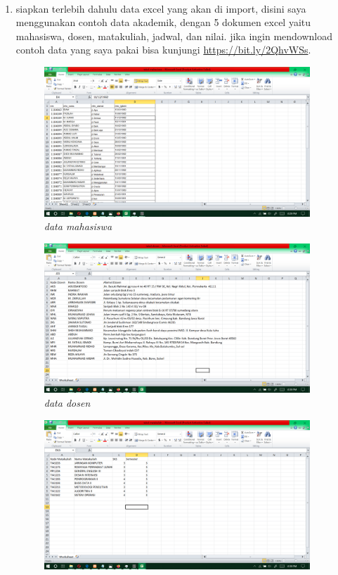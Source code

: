 \documentclass[12pt]{ociamthesis}  %
\begin{document}
\paragraph{}
\begin{enumerate}
	\item siapkan terlebih dahulu data excel yang akan di import, disini saya menggunakan contoh data akademik, dengan 5 dokumen excel yaitu mahasiswa, dosen, matakuliah, jadwal, dan nilai. jika ingin mendownload contoh data yang saya pakai bisa kunjungi \url{https://bit.ly/2QhvWSs}.
	\begin{figure}[H]
    \centering
    \includegraphics[width=10cm]{figures/persiapan data/Screenshot (224).png}
    \caption{\textit{data mahasiswa}}
    \label{foto10}
 	\end{figure}
 	\begin{figure}[H]
    \centering
    \includegraphics[width=10cm]{figures/persiapan data/Screenshot (225).png} 
    \caption{\textit{data dosen}}
    \label{foto11}
 	\end{figure}
 	\begin{figure}[H]
    \centering
    \includegraphics[width=10cm]{figures/persiapan data/Screenshot (226).png}

\end{figure}
\end{enumerate}
\end{document}
